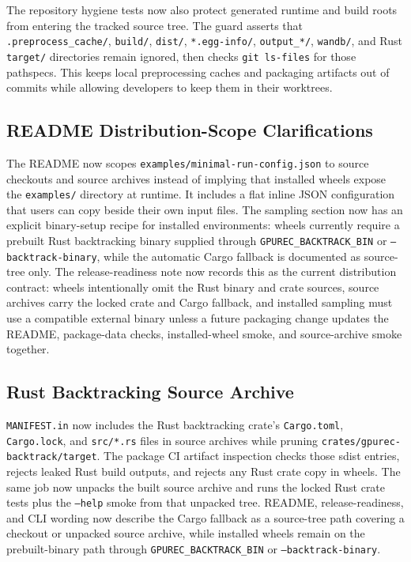 \documentclass[11pt]{article}
\begin{document}
The repository hygiene tests now also protect generated runtime and build roots
from entering the tracked source tree.  The guard asserts that
\texttt{.preprocess\_cache/}, \texttt{build/}, \texttt{dist/},
\texttt{*.egg-info/}, \texttt{output\_*/}, \texttt{wandb/}, and Rust
\texttt{target/} directories remain ignored, then checks \texttt{git ls-files}
for those pathspecs.  This keeps local preprocessing caches and packaging
artifacts out of commits while allowing developers to keep them in their
worktrees.

\subsection{README Distribution-Scope Clarifications}

The README now scopes \texttt{examples/minimal-run-config.json} to source
checkouts and source archives instead of implying that installed wheels expose
the \texttt{examples/} directory at runtime.  It includes a flat inline JSON
configuration that users can copy beside their own input files.  The sampling
section now has an explicit binary-setup recipe for installed environments:
wheels currently require a prebuilt Rust backtracking binary supplied through
\texttt{GPUREC\_BACKTRACK\_BIN} or \texttt{--backtrack-binary}, while the
automatic Cargo fallback is documented as source-tree only.  The
release-readiness note now records this as the current distribution contract:
wheels intentionally omit the Rust binary and crate sources, source archives
carry the locked crate and Cargo fallback, and installed sampling must use a
compatible external binary unless a future packaging change updates the README,
package-data checks, installed-wheel smoke, and source-archive smoke together.

\subsection{Rust Backtracking Source Archive}

\texttt{MANIFEST.in} now includes the Rust backtracking crate's
\texttt{Cargo.toml}, \texttt{Cargo.lock}, and \texttt{src/*.rs} files in source
archives while pruning \texttt{crates/gpurec-backtrack/target}.  The package
CI artifact inspection checks those sdist entries, rejects leaked Rust build
outputs, and rejects any Rust crate copy in wheels.  The same job now unpacks
the built source archive and runs the locked Rust crate tests plus the
\texttt{--help} smoke from that unpacked tree.  README, release-readiness, and
CLI wording now describe the Cargo fallback as a source-tree path covering a
checkout or unpacked source archive, while installed wheels remain on the
prebuilt-binary path through \texttt{GPUREC\_BACKTRACK\_BIN} or
\texttt{--backtrack-binary}.
\end{document}
